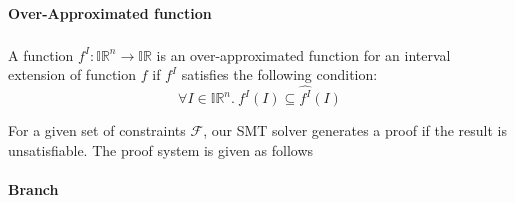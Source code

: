 \documentclass[envcountsect]{llncs}
\begin{document}
\paragraph{Over-Approximated  function}

A function $\widehat{f^I} : \mathbb{IR}^n \to \mathbb{IR}$ is an
over-approximated function for an interval extension of function $f$ if
$f^I$ satisfies the following condition:
\[
\forall I \in \mathbb{IR}^n. \
f^I(I) \subseteq \widehat{f^I}(I)
\]


For a given set of constraints $\mathcal{F}$, our SMT solver
generates a proof if the result is unsatisfiable. The proof system is
given as follows

\paragraph{Branch}
\begin{mathpar}
\end{mathpar}
\end{document}
